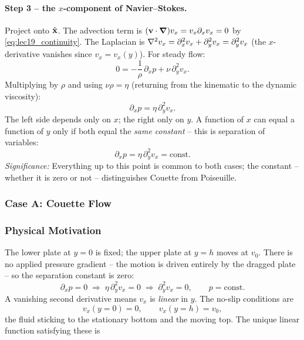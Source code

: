 \documentclass[../main.tex]{subfiles}
\begin{document}
\paragraph{Step 3 -- the $x$-component of Navier--Stokes.} Project onto $\hat{\mathbf{x}}$. The advection term is $(\mathbf{v}\cdot\grad)v_x=v_x\partial_x v_x=0$ by \eqref{eq:lec19_continuity}. The Laplacian is $\nabla^2 v_x=\partial_x^2 v_x+\partial_y^2 v_x=\partial_y^2 v_x$ (the $x$-derivative vanishes since $v_x=v_x(y)$). For steady flow:
\begin{equation}
  0 = -\frac{1}{\rho}\,\partial_x p + \nu\,\partial_y^2 v_x .
  \label{eq:lec19_xcomp}
\end{equation}
Multiplying by $\rho$ and using $\nu\rho=\eta$ (returning from the kinematic to the dynamic viscosity):
\begin{equation}
  \boxed{\;\partial_x p = \eta\,\partial_y^2 v_x .\;}
  \label{eq:lec19_separation}
\end{equation}
The left side depends only on $x$; the right only on $y$. A function of $x$ can equal a function of $y$ only if both equal the \emph{same constant} -- this is separation of variables:
\begin{equation}
  \partial_x p = \eta\,\partial_y^2 v_x = \text{const}.
  \label{eq:lec19_const}
\end{equation}
\textit{Significance:} Everything up to this point is common to both cases; the constant -- whether it is zero or not -- distinguishes Couette from Poiseuille.

\subsubsection{Case A: Couette Flow}\label{sec:lec19:couette}

\subsubsection*{Physical Motivation}
The lower plate at $y=0$ is fixed; the upper plate at $y=h$ moves at $v_0$. There is no applied pressure gradient -- the motion is driven entirely by the dragged plate -- so the separation constant is zero:
\begin{equation}
  \partial_x p = 0 \;\Longrightarrow\; \eta\,\partial_y^2 v_x = 0 \;\Longrightarrow\; \partial_y^2 v_x=0 ,
  \qquad p=\text{const}.
  \label{eq:lec19_couette_eq}
\end{equation}
A vanishing second derivative means $v_x$ is \emph{linear} in $y$. The no-slip conditions are
\begin{equation}
  v_x(y{=}0)=0,\qquad v_x(y{=}h)=v_0 ,
  \label{eq:lec19_couette_bc}
\end{equation}
the fluid sticking to the stationary bottom and the moving top. The unique linear function satisfying these is
\end{document}
